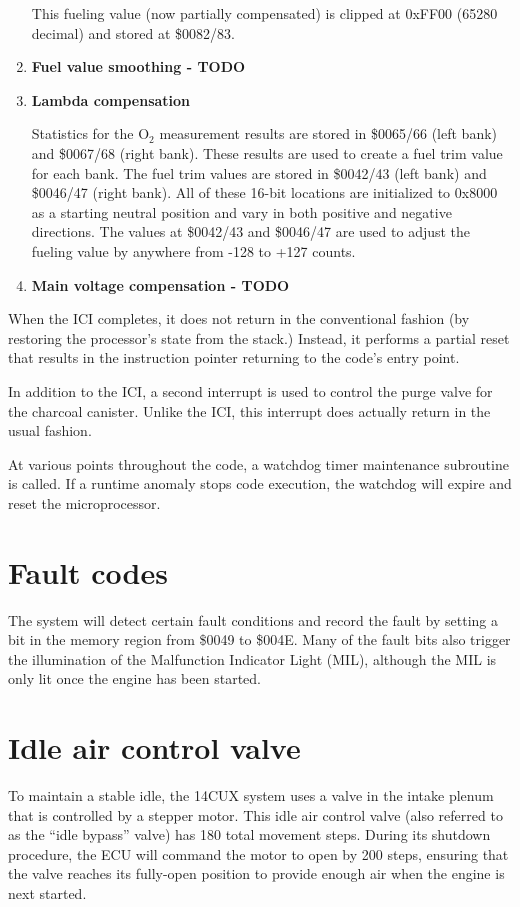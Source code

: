 \documentclass[11pt,twocolumn]{scrartcl}
\begin{document}
\begin{enumerate}
This fueling value (now partially compensated) is clipped at 0xFF00 (65280 decimal) and stored at \$0082/83.

\item
\textbf{Fuel value smoothing - TODO}

\item
\textbf{Lambda compensation}

Statistics for the O$_{2}$ measurement results are stored in \$0065/66 (left bank) and \$0067/68 (right bank). These results are used to create a fuel trim value for each bank. The fuel trim values are stored in \$0042/43 (left bank) and \$0046/47 (right bank). All of these 16-bit locations are initialized to 0x8000 as a starting neutral position and vary in both positive and negative directions. The values at \$0042/43 and \$0046/47 are used to adjust the fueling value by anywhere from -128 to +127 counts.

\item
\textbf{Main voltage compensation - TODO}

\end{enumerate}

When the ICI completes, it does not return in the conventional fashion (by restoring the processor's state from the stack.) Instead, it performs a partial reset that results in the instruction pointer returning to the code's entry point.

In addition to the ICI, a second interrupt is used to control the purge valve for the charcoal canister. Unlike the ICI, this interrupt does actually return in the usual fashion.

At various points throughout the code, a watchdog timer maintenance subroutine is called. If a runtime anomaly stops code execution, the watchdog will expire and reset the microprocessor.

\section {Fault codes}
The system will detect certain fault conditions and record the fault by setting a bit in the memory region from \$0049 to \$004E. Many of the fault bits also trigger the illumination of the Malfunction Indicator Light (MIL), although the MIL is only lit once the engine has been started.

\section {Idle air control valve}
To maintain a stable idle, the 14CUX system uses a valve in the intake plenum that is controlled by a stepper motor. This idle air control valve (also referred to as the ``idle bypass'' valve) has 180 total movement steps. During its shutdown procedure, the ECU will command the motor to open by 200 steps, ensuring that the valve reaches its fully-open position to provide enough air when the engine is next started.
\end{document}
